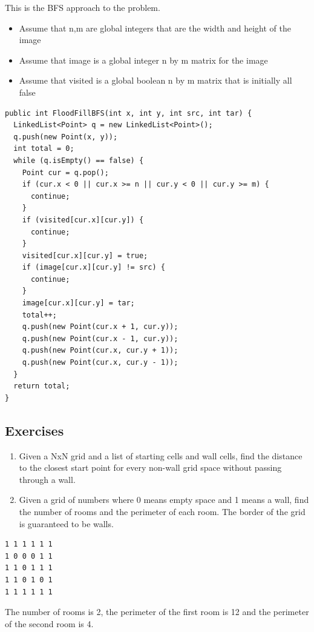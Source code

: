\documentclass[11pt,oneside]{book}
\begin{document}
This is the BFS approach to the problem.

\begin{itemize}
\item Assume that n,m are global integers that are the width and height of the image
\item Assume that image is a global integer n by m matrix for the image
\item Assume that visited is a global boolean n by m matrix that is initially all false
\end{itemize}

\begin{lstlisting}
public int FloodFillBFS(int x, int y, int src, int tar) {
  LinkedList<Point> q = new LinkedList<Point>();
  q.push(new Point(x, y));
  int total = 0;
  while (q.isEmpty() == false) {
    Point cur = q.pop();
    if (cur.x < 0 || cur.x >= n || cur.y < 0 || cur.y >= m) {
      continue;
    }
    if (visited[cur.x][cur.y]) {
      continue;
    }
    visited[cur.x][cur.y] = true;
    if (image[cur.x][cur.y] != src) {
      continue;
    }
    image[cur.x][cur.y] = tar;
    total++;
    q.push(new Point(cur.x + 1, cur.y));
    q.push(new Point(cur.x - 1, cur.y));
    q.push(new Point(cur.x, cur.y + 1));
    q.push(new Point(cur.x, cur.y - 1));
  }
  return total;
}
\end{lstlisting}

\subsection{Exercises}

\begin{enumerate}
\item Given a NxN grid and a list of starting cells and wall cells, find the distance to the closest start point for every non-wall grid space without passing through a wall. 
\item Given a grid of numbers where 0 means empty space and 1 means a wall, find the number of rooms and the perimeter of each room. The border of the grid is guaranteed to be walls. 
\end{enumerate}

\begin{lstlisting}
1 1 1 1 1 1
1 0 0 0 1 1
1 1 0 1 1 1
1 1 0 1 0 1
1 1 1 1 1 1
\end{lstlisting}

The number of rooms is 2,  the perimeter of the first room is 12 and the perimeter of the second room is 4.
\end{document}
